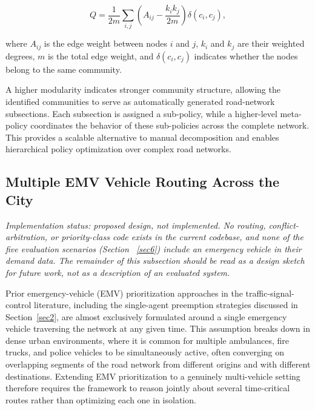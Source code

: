 \documentclass[3p,times]{elsarticle}
\theoremstyle{plain}
\theoremstyle{definition}
\begin{document}
\begin{equation}
Q = \frac{1}{2m}\sum_{i,j}\left(A_{ij} - \frac{k_i k_j}{2m}\right)
\delta(c_i, c_j),
\end{equation}

where $A_{ij}$ is the edge weight between nodes $i$ and $j$, $k_i$ and
$k_j$ are their weighted degrees, $m$ is the total edge weight, and
$\delta(c_i, c_j)$ indicates whether the nodes belong to the same
community.

A higher modularity indicates stronger community structure, allowing
the identified communities to serve as automatically generated
road-network subsections. Each subsection is assigned a
sub-policy, while a higher-level meta-policy
coordinates the behavior of these sub-policies across the complete
network. This provides a scalable alternative to manual decomposition
and enables hierarchical policy optimization over complex road
networks.


\subsection{Multiple EMV Vehicle Routing Across the City}\label{subsec3-2}

\textit{Implementation status: proposed design, not implemented. No
routing, conflict-arbitration, or priority-class code exists in the
current codebase, and none of the five evaluation scenarios (Section~
\ref{sec6}) include an emergency vehicle in their demand data. The
remainder of this subsection should be read as a design sketch for
future work, not as a description of an evaluated system.}

Prior emergency-vehicle (EMV) prioritization approaches in the
traffic-signal-control literature, including the single-agent
preemption strategies discussed in Section~\ref{sec2}, are almost
exclusively formulated around a single emergency vehicle traversing
the network at any given time. This assumption breaks down in dense
urban environments, where it is common for multiple ambulances, fire
trucks, and police vehicles to be simultaneously active, often
converging on overlapping segments of the road network from different
origins and with different destinations. Extending EMV prioritization
to a genuinely multi-vehicle setting therefore requires the framework
to reason jointly about several time-critical routes rather than
optimizing each one in isolation.
\end{document}
